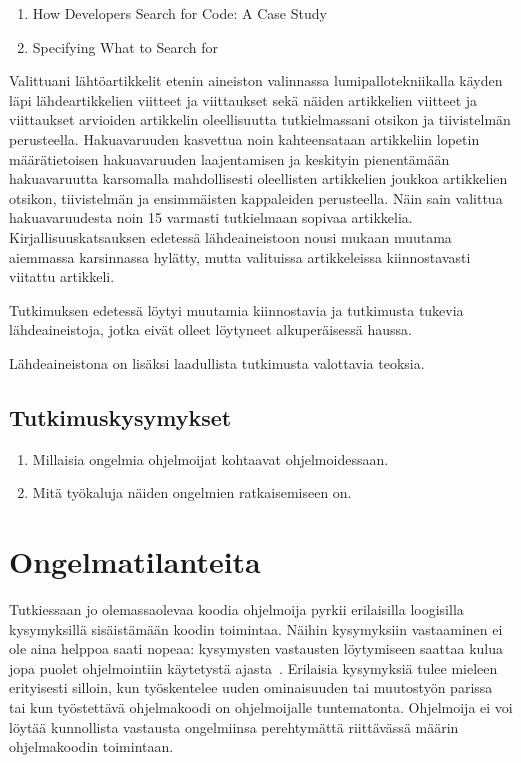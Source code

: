 \documentclass[finnish]{tktltiki2}
\theoremstyle{definition}
\theoremstyle{remark}
\begin{document}
\begin{enumerate}
  \item How Developers Search for Code: A Case Study~\cite{g_search_code}
  \item Specifying What to Search for~\cite{what-to-search-for}
\end{enumerate}
Valittuani lähtöartikkelit etenin aineiston valinnassa lumipallotekniikalla
käyden läpi lähdeartikkelien viitteet ja viittaukset sekä näiden artikkelien viitteet ja viittaukset arvioiden artikkelin oleellisuutta tutkielmassani otsikon ja tiivistelmän perusteella. Hakuavaruuden kasvettua noin kahteensataan artikkeliin lopetin määrätietoisen hakuavaruuden laajentamisen ja keskityin pienentämään hakuavaruutta karsomalla mahdollisesti oleellisten artikkelien joukkoa artikkelien otsikon, tiivistelmän ja ensimmäisten kappaleiden perusteella. Näin sain valittua hakuavaruudesta noin 15 varmasti tutkielmaan sopivaa artikkelia.  Kirjallisuuskatsauksen edetessä lähdeaineistoon nousi mukaan muutama aiemmassa karsinnassa hylätty, mutta valituissa artikkeleissa kiinnostavasti viitattu artikkeli.

Tutkimuksen edetessä löytyi muutamia kiinnostavia ja tutkimusta tukevia lähdeaineistoja, jotka eivät olleet löytyneet alkuperäisessä haussa.

Lähdeaineistona on lisäksi laadullista tutkimusta valottavia teoksia.

\subsection{Tutkimuskysymykset}
\begin{enumerate}
\item Millaisia ongelmia ohjelmoijat kohtaavat ohjelmoidessaan.
\item Mitä työkaluja näiden ongelmien ratkaisemiseen on.
\end{enumerate}

\section{Ongelmatilanteita}

Tutkiessaan jo olemassaolevaa koodia ohjelmoija pyrkii erilaisilla loogisilla kysymyksillä sisäistämään koodin toimintaa. Näihin kysymyksiin vastaaminen ei ole aina helppoa saati nopeaa: kysymysten vastausten löytymiseen saattaa kulua jopa puolet ohjelmointiin käytetystä ajasta~\cite{eliciting-design-requirements-for-maintenance-oriented-ides}. Erilaisia kysymyksiä tulee mieleen erityisesti silloin, kun työskentelee uuden ominaisuuden tai muutostyön parissa tai kun työstettävä ohjelmakoodi on ohjelmoijalle tuntematonta. Ohjelmoija ei voi löytää kunnollista vastausta ongelmiinsa perehtymättä riittävässä määrin ohjelmakoodin toimintaan.
\end{document}
